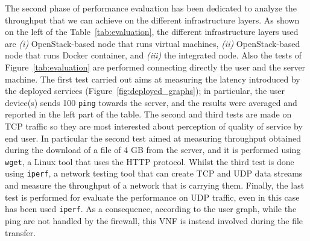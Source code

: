 The second phase of performance evaluation has been dedicated to analyze the throughput that we can achieve on the different infrastructure layers. As shown on the left of the Table~\ref{tab:evaluation}, the different infrastructure layers used are \textit{(i)} OpenStack-based node that runs virtual machines, \textit{(ii)}  OpenStack-based node that runs Docker container, and \textit{(iii)} the integrated node. Also the tests of Figure~\ref{tab:evaluation} are performed connecting directly the user and the server machine. %
The first test carried out aims at measuring the latency introduced by the deployed services (Figure~\ref{fig:deployed_graphs}); in particular, the user device(s) sends 100 \texttt{ping} towards the server, and the results were averaged and reported in the left part of the table.
The second and third tests are made on TCP traffic so they are most interested about perception of quality of service by end user. In particular the second test aimed at measuring throughput obtained during the download of a file of 4 GB from the server, and it is performed using  \texttt{wget}, a Linux tool that uses the HTTP protocol. Whilst the third test is done using \texttt{iperf}, a network testing tool that can create TCP and UDP data streams and measure the throughput of a network that is carrying them. Finally, the last test is performed for evaluate the performance on UDP traffic, even in this case has been used \texttt{iperf}.
As a consequence, according to the user graph, while the ping are not handled by the firewall, this VNF is instead involved during the file transfer.
%
%
\renewcommand{\arraystretch}{1.5}
